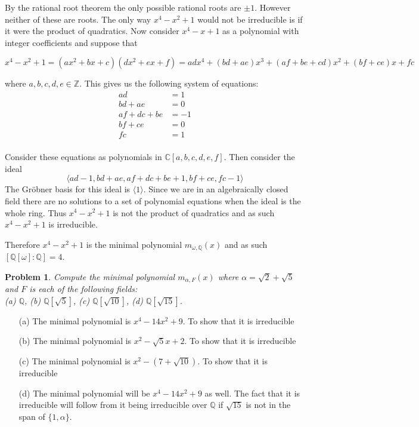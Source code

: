 \documentclass[10pt]{article}
\newcommand{\bb}[1]{\mathbb{#1}}
\theoremstyle{plain}
\newtheorem{problem}{Problem}
\theoremstyle{remark}
\begin{document}
By the rational root theorem the only possible rational roots are $\pm 1$.
However neither of these are roots. The only way $x^4-x^2+1$ would not
be irreducible is if it were the product of quadratics. Now consider
$x^4-x+1$ as a polynomial with integer coefficients and suppose that

\[x^4-x^2+1 = (ax^2+bx+c)(dx^2+ex+f)=adx^4+(bd+ae)x^3+(af+be+cd)x^2+(bf+ce)x+fc\]

where $a,b,c,d,e\in\bb{Z}$. This gives us the following system of equations:
\begin{align*}
  ad &=1\\
  bd+ae &= 0\\
  af+dc+be &= -1\\
  bf+ce &=0 \\
  fc &= 1\\
\end{align*}

Consider these equations as polynomials in $\bb{C}[a,b,c,d,e,f]$. Then
consider the ideal
\[ \langle ad-1,bd+ae,af+dc+be+1,bf+ce,fc-1\rangle \]
The Gr\"obner basis for this ideal is $\langle 1\rangle$. Since we are in an algebraically
closed field there are no solutions to a set of polynomial equations when
the ideal is the whole ring. Thus $x^4-x^2+1$ is not the product of quadratics
and as such $x^4-x^2+1$ is irreducible.

Therefore $x^4-x^2+1$ is the minimal polynomial $m_{\omega,\bb{Q}}(x)$ and as such
$[\bb{Q}[\omega]:\bb{Q}]=4$.

\begin{problem}
  Compute the minimal polynomial $m_{\alpha,F}(x)$ where
  $\alpha = \sqrt{2} + \sqrt{5}$ and $F$ is each of the following fields:\\
  (a) $\mathbb{Q}$, \hspace{1cm} (b)
  $\mathbb{Q}[\sqrt{5}]$, \hspace{1cm} (c) $\mathbb{Q}[\sqrt{10}]$,
  \hspace{1cm} (d) $\mathbb{Q}[\sqrt{15}]$.
\end{problem}

\begin{enumerate}
\item[(a)] The minimal polynomial is $x^4-14x^2+9$. To show that it is irreducible
\item[(b)] The minimal polynomial is $x^2-\sqrt{5}x+2$. To show that it
  is irreducible
\item[(c)] The minimal polynomial is $x^2-(7+\sqrt{10})$. To show that
  it is irreducible
\item[(d)] The minimal polynomial will be $x^4-14x^2+9$ as well. The
  fact that it is irreducible will follow from it being irreducible over
  $\bb{Q}$ if $\sqrt{15}$ is not in the span of $\{1,\alpha\}$.
\end{enumerate}
\end{document}
